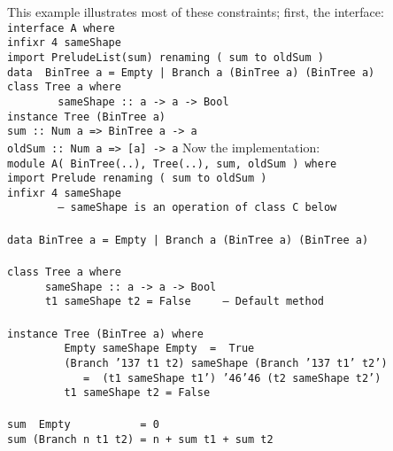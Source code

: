 This example illustrates most of these constraints; first, the
interface:
\bprog
\mbox{\tt interface\ A\ where}\\
\mbox{\tt infixr\ 4\ }\bkqB\mbox{\tt sameShape}\bkqA\mbox{\tt \ \ \ \ \ \ \ \ }\\
\mbox{\tt import\ PreludeList(sum)\ renaming\ (\ sum\ to\ oldSum\ )}\\
\mbox{\tt data\ \ BinTree\ a\ =\ Empty\ |\ Branch\ a\ (BinTree\ a)\ (BinTree\ a)\ \ \ \ \ \ }\\
\mbox{\tt class\ Tree\ a\ where\ }\\
\mbox{\tt \ \ \ \ \ \ \ \ sameShape\ ::\ a\ ->\ a\ ->\ Bool}\\
\mbox{\tt instance\ Tree\ (BinTree\ a)}\\
\mbox{\tt sum\ ::\ Num\ a\ =>\ BinTree\ a\ ->\ a}\\
\mbox{\tt oldSum\ ::\ Num\ a\ =>\ [a]\ ->\ a}
\eprog
Now the implementation:
\bprog
\mbox{\tt module\ A(\ BinTree(..),\ Tree(..),\ sum,\ oldSum\ )\ where}\\
\mbox{\tt import\ Prelude\ renaming\ (\ sum\ to\ oldSum\ )}\\
\mbox{\tt infixr\ 4\ }\bkqB\mbox{\tt sameShape}\bkqA\mbox{\tt }\\
\mbox{\tt \ \ \ \ \ \ \ \ --\ }\bkqB\mbox{\tt sameShape}\bkqA\mbox{\tt \ is\ an\ operation\ of\ class\ C\ below}\\
\mbox{\tt }\\[-8pt]
\mbox{\tt data\ BinTree\ a\ =\ Empty\ |\ Branch\ a\ (BinTree\ a)\ (BinTree\ a)}\\
\mbox{\tt }\\[-8pt]
\mbox{\tt class\ Tree\ a\ where\ }\\
\mbox{\tt \ \ \ \ \ \ sameShape\ ::\ a\ ->\ a\ ->\ Bool}\\
\mbox{\tt \ \ \ \ \ \ t1\ }\bkqB\mbox{\tt sameShape}\bkqA\mbox{\tt \ t2\ =\ False\ \ \ \ \ --\ Default\ method}\\
\mbox{\tt }\\[-8pt]
\mbox{\tt instance\ Tree\ (BinTree\ a)\ where\ }\\
\mbox{\tt \ \ \ \ \ \ \ \ \ Empty\ }\bkqB\mbox{\tt sameShape}\bkqA\mbox{\tt \ Empty\ \ =\ \ True}\\
\mbox{\tt \ \ \ \ \ \ \ \ \ (Branch\ {\char'137}\ t1\ t2)\ }\bkqB\mbox{\tt sameShape}\bkqA\mbox{\tt \ (Branch\ {\char'137}\ t1'\ t2')\ \ }\\
\mbox{\tt \ \ \ \ \ \ \ \ \ \ \ \ =\ \ (t1\ }\bkqB\mbox{\tt sameShape}\bkqA\mbox{\tt \ t1')\ {\char'46}{\char'46}\ (t2\ }\bkqB\mbox{\tt sameShape}\bkqA\mbox{\tt \ t2')}\\
\mbox{\tt \ \ \ \ \ \ \ \ \ t1\ }\bkqB\mbox{\tt sameShape}\bkqA\mbox{\tt \ t2\ =\ False}\\
\mbox{\tt }\\[-8pt]
\mbox{\tt sum\ \ Empty\ \ \ \ \ \ \ \ \ \ \ =\ 0}\\
\mbox{\tt sum\ (Branch\ n\ t1\ t2)\ =\ n\ +\ sum\ t1\ +\ sum\ t2}
\eprogNoSkip

